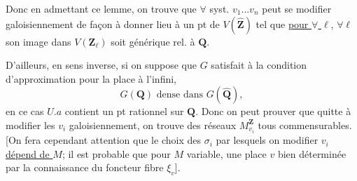 Donc en admettant ce lemme, on trouve que $\forall$ syst. $v_1\ldots v_n$ peut se modifier galoisiennement de façon à donner lieu à un pt  de $V(\widehat{\mathbf Z})$  tel que \uline{pour $\forall$ $\ell$}, $\forall\ell$ son image dans $V(\mathbf Z_\ell)$ soit générique rel. à $\mathbf Q$.

D'ailleurs, en sens inverse, si on suppose que $G$ satisfait à la condition d'approximation pour la place à l'infini,
\[
 G(\mathbf Q)\text{ dense dans }G(\widehat{\mathbf Q}),
\]
en ce cas  $U.a$ contient un pt rationnel sur $\mathbf Q$. Donc on peut prouver que quitte à modifier les $v_i$ galoisiennement, on trouve des réseaux $M_{v_i}^{\mathbf Z}$ tous commensurables. [On fera cependant attention que le choix des $\sigma_i$ par lesquels on  modifier $v_i$ \uline{dépend de $M$}; il est probable que pour $M$ variable, une place $v$  bien déterminée par la connaissance du foncteur fibre $\xi_v$].

